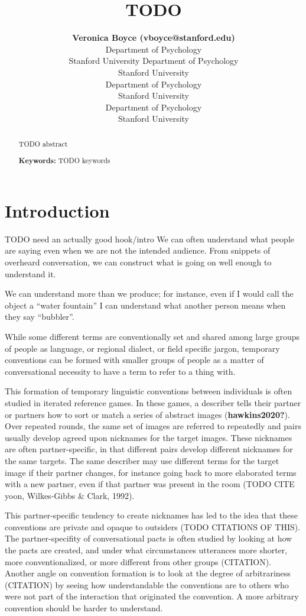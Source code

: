 \documentclass[10pt, letterpaper]{article}
\title{TODO}
\author{{\large \bf Veronica Boyce (vboyce@stanford.edu)} \\ Department of Psychology \\ Stanford University \And {\large \bf Ben Prystawski (benpry@stanford.edu)} Department of Psychology \\ Stanford University \AND {\large \bf Alvin Wei Ming Tan (tanawm@stanford.edu)} \\ Department of Psychology \\ Stanford University \And {\large \bf Michael C. Frank (mcfrank@stanford.edu)} \\ Department of Psychology \\ Stanford University}
\begin{document}
\maketitle

\begin{abstract}
TODO abstract

\textbf{Keywords:}
TODO keywords
\end{abstract}

\section{Introduction}\label{introduction}

TODO need an actually good hook/intro We can often understand what
people are saying even when we are not the intended audience. From
snippets of overheard conversation, we can construct what is going on
well enough to understand it.

We can understand more than we produce; for instance, even if I would
call the object a ``water fountain'' I can understand what another
person means when they say ``bubbler''.

While some different terms are conventionally set and shared among large
groups of people as language, or regional dialect, or field specific
jargon, temporary conventions can be formed with smaller groups of
people as a matter of conversational necessity to have a term to refer
to a thing with.

This formation of temporary linguistic conventions between individuals
is often studied in iterated reference games. In these games, a
describer tells their partner or partners how to sort or match a series
of abstract images (\textbf{hawkins2020?}). Over repeated rounds, the
same set of images are referred to repeatedly and pairs usually develop
agreed upon nicknames for the target images. These nicknames are often
partner-specific, in that different pairs develop different nicknames
for the same targets. The same describer may use different terms for the
target image if their partner changes, for instance going back to more
elaborated terms with a new partner, even if that partner was present in
the room (TODO CITE yoon, Wilkes-Gibbs \& Clark, 1992).

This partner-specific tendency to create nicknames has led to the idea
that these conventions are private and opaque to outsiders (TODO
CITATIONS OF THIS). The partner-specifity of conversational pacts is
often studied by looking at how the pacts are created, and under what
circumstances utterances more shorter, more conventionalized, or more
different from other groups (CITATION). Another angle on convention
formation is to look at the degree of arbitrariness (CITATION) by seeing
how understandable the conventions are to others who were not part of
the interaction that originated the convention. A more arbitrary
convention should be harder to understand.
\end{document}
